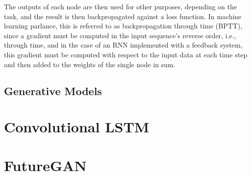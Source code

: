 \documentclass{scrartcl}
\begin{document}
The outputs of each node are then used for other purposes, depending on the
task, and the result is then backpropagated against a loss function. In machine
learning parlance, this is referred to as backpropagation through time (BPTT),
since a gradient must be computed in the input sequence's reverse order, i.e.,
through time, and in the case of an RNN implemented with a feedback system,
this gradient must be computed with respect to the input data at each time step
and then added to the weights of the single node in sum. 

\subsection{Generative Models}
\label{subsec:generative}

\section{Convolutional LSTM}
\label{sec:conv_lstm}

\section{FutureGAN}
\label{sec:futuregan}

\newpage
\section{}
\label{}

\newpage
\section{}
\label{}

\newpage
\section{}
\label{}

\newpage
\section{}
\label{}



\newpage

\newpage
\end{document}
